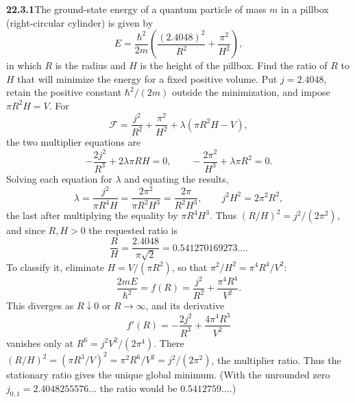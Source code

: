 \par\bigskip
\noindent\textbf{22.3.1}\quad The ground-state energy of a quantum
particle of mass $m$ in a pillbox (right-circular cylinder) is
given by
\[
E=\frac{\hbar^{2}}{2m}
\left(\frac{(2.4048)^{2}}{R^{2}}+\frac{\pi^{2}}{H^{2}}\right),
\]
in which $R$ is the radius and $H$ is the height of the pillbox.
Find the ratio of $R$ to $H$ that will minimize the energy for a
fixed positive volume.
\solution
Put $j=2.4048$, retain the positive constant $\hbar^2/(2m)$
outside the minimization, and impose $\pi R^2H=V$.
For
\[
\mathcal F=\frac{j^2}{R^2}+\frac{\pi^2}{H^2}
+\lambda(\pi R^2H-V),
\]
the two multiplier equations are
\[
-\frac{2j^2}{R^3}+2\lambda\pi RH=0,\qquad
-\frac{2\pi^2}{H^3}+\lambda\pi R^2=0.
\]
Solving each equation for $\lambda$ and equating the results,
\[
\lambda=\frac{j^2}{\pi R^4H}
=\frac{2\pi^2}{\pi R^2H^3}=\frac{2\pi}{R^2H^3},
\qquad j^2H^2=2\pi^2R^2,
\]
the last after multiplying the equality by $\pi R^4H^3$. Thus
$(R/H)^2=j^2/(2\pi^2)$, and since $R,H>0$ the requested ratio is
\[
\boxed{\frac RH=\frac{2.4048}{\pi\sqrt2}
=0.541270169273\ldots}.
\]
To classify it, eliminate $H=V/(\pi R^2)$, so that
$\pi^2/H^2=\pi^4R^4/V^2$:
\[
\frac{2mE}{\hbar^2}
=f(R)=\frac{j^2}{R^2}+\frac{\pi^4R^4}{V^2}.
\]
This diverges as $R\downarrow0$ or $R\to\infty$, and its derivative
\[
f'(R)=-\frac{2j^2}{R^3}+\frac{4\pi^4R^3}{V^2}
\]
vanishes only at $R^6=j^2V^2/(2\pi^4)$. There
$(R/H)^2=(\pi R^3/V)^2=\pi^2R^6/V^2=j^2/(2\pi^2)$, the multiplier
ratio. Thus the stationary ratio gives the unique global minimum.
(With the unrounded zero $j_{0,1}=2.4048255576\ldots$ the ratio would be
$0.5412759\ldots$.)


